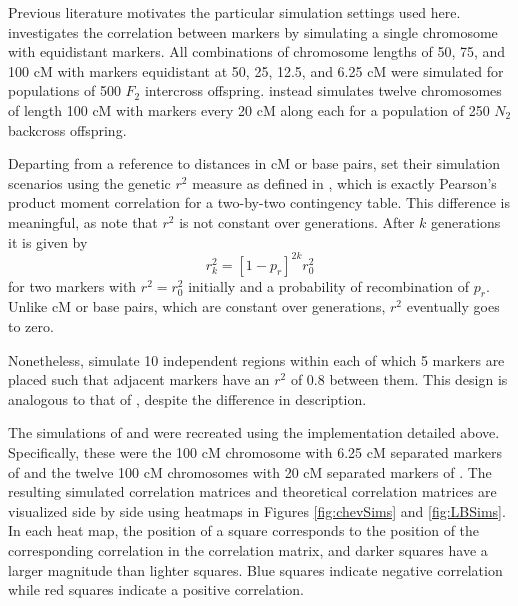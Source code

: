 \documentclass[12pt]{article}
\begin{document}
Previous literature motivates the particular simulation settings used here. \cite{cheverud2001} investigates the correlation between markers by simulating a single chromosome with equidistant markers. All combinations of chromosome lengths of 50, 75, and 100 cM with markers equidistant at 50, 25, 12.5, and 6.25 cM were simulated for populations of 500 $F_2$ intercross offspring. \cite{LanderBotstein1989} instead simulates twelve chromosomes of length 100 cM with markers every 20 cM along each for a population of 250 $N_2$ backcross offspring.

Departing from a reference to distances in cM or base pairs, \cite{LiJi2005} set their simulation scenarios using the genetic $r^2$ measure as defined in \cite{hillrobertson1968}, which is exactly Pearson's product moment correlation for a two-by-two contingency table.
This difference is meaningful, as \cite{siegmundyakir2007} note that $r^2$ is not constant over generations. After $k$ generations it is given by
$$r_k^2 = \left [ 1 - p_r \right ]^{2k}  r^2_0$$
for two markers with $r^2 = r^2_0$ initially and a probability of recombination of $p_r$. Unlike cM or base pairs, which are constant over generations, $r^2$ eventually goes to zero.

Nonetheless, \cite{LiJi2005} simulate 10 independent regions within each of which 5 markers are placed such that adjacent markers have an $r^2$ of 0.8 between them. This design is analogous to that of \cite{LanderBotstein1989}, despite the difference in description.

The simulations of \cite{cheverud2001} and \cite{LanderBotstein1989} were recreated using the implementation detailed above. Specifically, these were the 100 cM chromosome with 6.25 cM separated markers of \cite{cheverud2001} and the twelve 100 cM chromosomes with 20 cM separated markers of \cite{LanderBotstein1989}. The resulting simulated correlation matrices and theoretical correlation matrices are visualized side by side using heatmaps in Figures \ref{fig:chevSims} and \ref{fig:LBSims}. In each heat map, the position of a square corresponds to the position of the corresponding correlation in the correlation matrix, and darker squares have a larger magnitude than lighter squares. Blue squares indicate negative correlation while red squares indicate a positive correlation.
\end{document}

